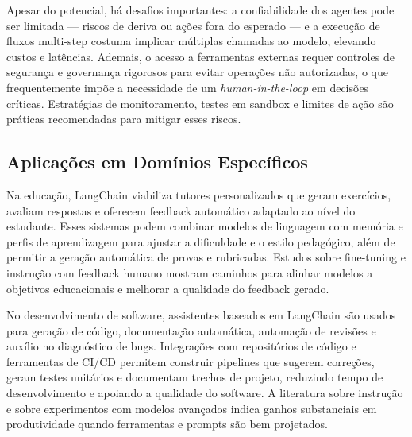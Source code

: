 \documentclass[12pt]{article}
\begin{document}
Apesar do potencial, há desafios importantes: a confiabilidade dos agentes pode ser limitada — riscos de deriva ou ações fora do esperado — e a execução de fluxos multi-step costuma implicar múltiplas chamadas ao modelo, elevando custos e latências. Ademais, o acesso a ferramentas externas requer controles de segurança e governança rigorosos para evitar operações não autorizadas, o que frequentemente impõe a necessidade de um \emph{human-in-the-loop} em decisões críticas. Estratégias de monitoramento, testes em sandbox e limites de ação são práticas recomendadas para mitigar esses riscos. \cite{ji2023survey, openai2023gpt4, langsmith2023}



\subsection{Aplicações em Domínios Específicos}
\label{subsec:dominios}

Na educação, LangChain viabiliza tutores personalizados que geram exercícios, avaliam respostas e oferecem feedback automático adaptado ao nível do estudante. Esses sistemas podem combinar modelos de linguagem com memória e perfis de aprendizagem para ajustar a dificuldade e o estilo pedagógico, além de permitir a geração automática de provas e rubricadas. Estudos sobre fine-tuning e instrução com feedback humano mostram caminhos para alinhar modelos a objetivos educacionais e melhorar a qualidade do feedback gerado. \cite{ouyang2022training, liu2023pre}

No desenvolvimento de software, assistentes baseados em LangChain são usados para geração de código, documentação automática, automação de revisões e auxílio no diagnóstico de bugs. Integrações com repositórios de código e ferramentas de CI/CD permitem construir pipelines que sugerem correções, geram testes unitários e documentam trechos de projeto, reduzindo tempo de desenvolvimento e apoiando a qualidade do software. A literatura sobre instrução e sobre experimentos com modelos avançados indica ganhos substanciais em produtividade quando ferramentas e prompts são bem projetados. \cite{bubeck2023sparks, ouyang2022training}
\end{document}
